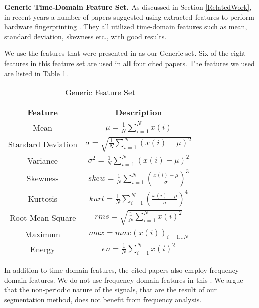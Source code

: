 \documentclass[english]{llncs}
\begin{document}
{\bf Generic Time-Domain Feature Set.}
  As discussed in Section \ref{RelatedWork}, in recent years a number of papers suggested using extracted features to perform hardware fingerprinting \cite{dey2014accelprint, choi2018identifying, choi2018voltageids, kneib2018scission}. They all utilized time-domain features such as mean, standard deviation, skewness etc., with good results.
  
  
  We use the features that were presented in \cite{kneib2018scission} as our Generic set. Six of the eight features in this feature set are used in all four cited papers. The features we used are listed in Table \ref{tab:generic_feature_set}.
  
  \begin{table}[t]
    \caption{Generic Feature Set}
    \label{tab:generic_feature_set}
    \centering
    \begin{tabular}{|c c|} 
      \hline
      Feature & Description \\ [0.5ex] 
      \hline\hline
      Mean & \(\mu = \frac{1}{N}\sum_{i=1}^{N}x(i)\) \\
      \hline
      Standard Deviation & \(\sigma = \sqrt{\frac{1}{N}\sum_{i=1}^{N}(x(i)-\mu)^2}\) \\
      \hline
      Variance & \(\sigma^2 = \frac{1}{N}\sum_{i=1}^{N}(x(i)-\mu)^2\) \\
      \hline
      Skewness & \(skew = \frac{1}{N} \sum_{i=1}^{N}(\frac{x(i)-\mu}{\sigma})^3\) \\
      \hline
      Kurtosis & \(kurt = \frac{1}{N} \sum_{i=1}^{N}(\frac{x(i)-\mu}{\sigma})^4\) \\
      \hline
      Root Mean Square & \(rms = \sqrt{\frac{1}{N}\sum_{i=1}^{N}x(i)^2}\) \\
      \hline
      Maximum & \(max = max(x(i))_{i=1...N}\) \\
      \hline
      Energy & \(en = \frac{1}{N}\sum_{i=1}^{N}x(i)^2\) \\
      \hline
    \end{tabular}
  \end{table}
  
  In addition to time-domain features, the cited papers also employ frequency-domain features. We do not use frequency-domain features in this \iftoggle{paper} {paper} {work}. We argue that the non-periodic nature of the signals, that are the result of our segmentation method, does not benefit from frequency analysis.
\end{document}
